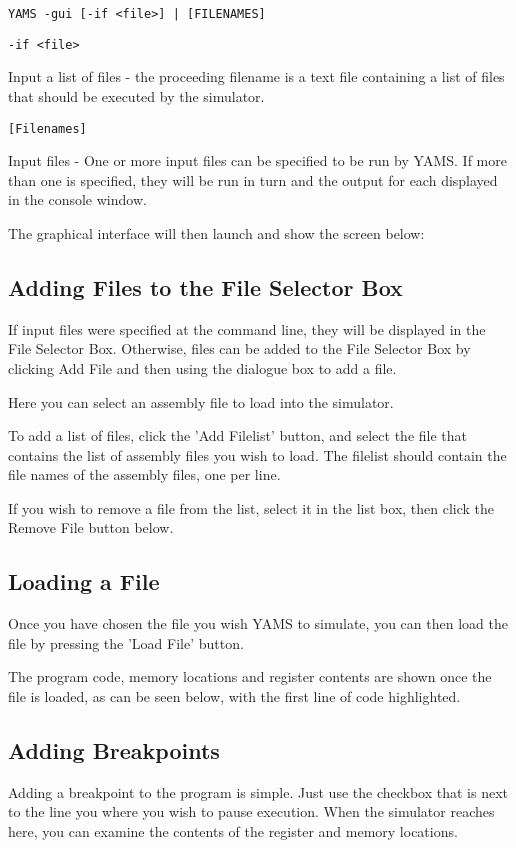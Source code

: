 \documentclass[12pt]{report}
\begin{document}
\begin{verbatim}
YAMS -gui [-if <file>] | [FILENAMES]
\end{verbatim}

\begin{verbatim}
-if <file>
\end{verbatim}
Input a list of files - the proceeding filename	is a text file containing a list of files that should be executed by the simulator.

\begin{verbatim}
[Filenames]
\end{verbatim}
Input files - One or more input files can be specified to be run by YAMS.  If more than one is specified, they will be run in turn and the output for each displayed in the console window.



The graphical interface will then launch and show the screen below:

\subsection{Adding Files to the File Selector Box}
If input files were specified at the command line, they will be displayed in the File Selector Box. Otherwise, files can be added to the File Selector Box by clicking Add File and then using the dialogue box to add a file.

Here you can select an assembly file to load into the simulator.

To add a list of files, click the 'Add Filelist' button, and select the file that contains the list of assembly files you wish to load.  The filelist should contain the file names of the assembly files, one per line.

If you wish to remove a file from the list, select it in the list box, then click the Remove File button below.


\subsection{Loading a File}
Once you have chosen the file you wish YAMS to simulate, you can then load the file by pressing the 'Load File' button.

The program code, memory locations and register contents are shown once the file is loaded, as can be seen below, with the first line of code highlighted.


\subsection{Adding Breakpoints}
Adding a breakpoint to the program is simple.  Just use the checkbox that is next to the line you where you wish to pause execution.  When the simulator reaches here, you can examine  the contents of the register and memory locations.
\end{document}
